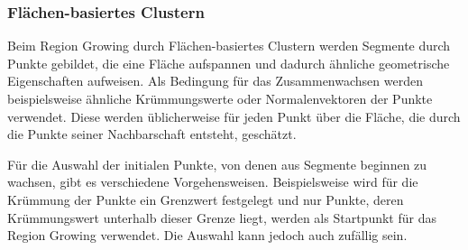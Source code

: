 
\subsubsection[Flächen-basiertes Clustern (Schmelzer)]{Flächen-basiertes Clustern}

Beim Region Growing durch Flächen-basiertes Clustern werden Segmente durch Punkte gebildet, die eine Fläche aufspannen und dadurch ähnliche geometrische Eigenschaften aufweisen. Als Bedingung für das Zusammenwachsen werden beispielsweise ähnliche Krümmungswerte oder Normalenvektoren der Punkte verwendet. Diese werden üblicherweise für jeden Punkt über die Fläche, die durch die Punkte seiner Nachbarschaft entsteht, geschätzt. 

Für die Auswahl der initialen Punkte, von denen aus Segmente beginnen zu wachsen, gibt es verschiedene Vorgehensweisen. Beispielsweise wird für die Krümmung der Punkte ein Grenzwert festgelegt und nur Punkte, deren Krümmungswert unterhalb dieser Grenze liegt, werden als Startpunkt für das Region Growing verwendet. Die Auswahl kann jedoch auch zufällig sein. 

